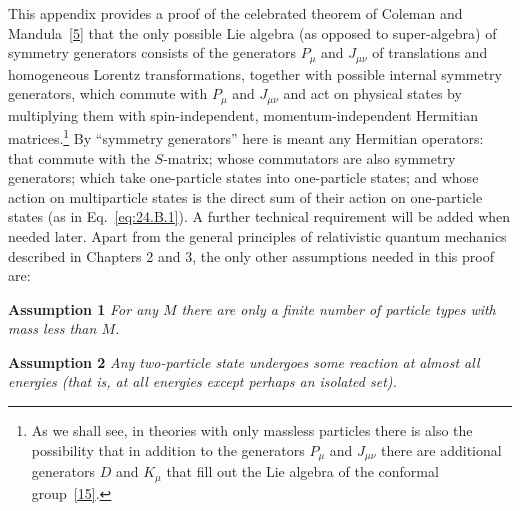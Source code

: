 
This appendix provides a proof of the celebrated theorem of Coleman and
Mandula~\hyperref[ch24-ref-5]{[5]} that the only possible Lie algebra (as
opposed to super-algebra) of symmetry generators consists of the generators
$P_\mu$ and $J_{\mu\nu}$ of translations and homogeneous Lorentz
transformations, together with possible internal symmetry generators, which
commute with $P_\mu$ and $J_{\mu\nu}$ and act on physical states by multiplying
them with spin-independent, momentum-independent Hermitian
matrices.\footnote{As we shall see, in theories with only massless particles
there is also the possibility that in addition to the generators $P_\mu$ and
$J_{\mu\nu}$ there are additional generators $D$ and $K_\mu$ that fill out the
Lie algebra of the conformal group~\hyperref[ch24-ref-15]{[15]}.} By
``symmetry generators'' here is meant any Hermitian operators: that commute
with the $S$-matrix; whose commutators are also symmetry generators; which take
one-particle states into one-particle states; and whose action on multiparticle
states is the direct sum of their action on one-particle states (as in
Eq.~\eqref{eq:24.B.1}). A further technical requirement will be added when
needed later. Apart from the general principles of relativistic quantum
mechanics described in Chapters 2 and 3, the only other assumptions needed in
this proof are:

\medskip
\noindent\textbf{Assumption 1}\quad
\textit{For any $M$ there are only a finite number of particle types with mass
less than $M$.}

\medskip
\noindent\textbf{Assumption 2}\quad
\textit{Any two-particle state undergoes some reaction at almost all energies
(that is, at all energies except perhaps an isolated set).}

